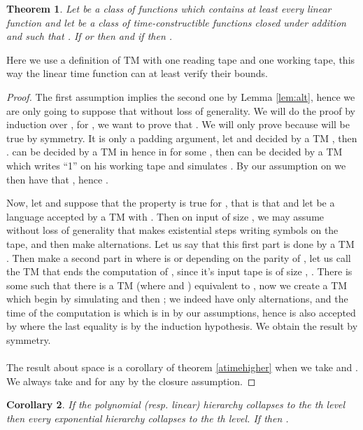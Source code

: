 \documentclass[a4paper,12pt]{article}
\newtheorem{theorem}{Theorem}[section]
\newtheorem{corollary}[theorem]{Corollary}
\theoremstyle{definition}
\begin{document}
\begin{theorem}\label{little_collapse}
  Let  be a class of functions which contains at least every linear
  function and let  be a class of time-constructible functions
  closed under addition and such that . If  or
   then  and if
   then .
\end{theorem}
Here we use a definition of TM with one reading tape and one working
tape, this way the linear time function can at least verify their
bounds.
\begin{proof}
  The first assumption implies the second one by Lemma \ref{lem:alt},
  hence we are only going to suppose that
   without loss of generality. We will do
  the proof by induction over , for , we want to prove that
  .  We will only prove 
  because  will be true by symmetry. It is only a padding
  argument, let  and  decided by a TM ,
  then .  can be decided by a TM 
  in  hence in  for some ,
  then  can be decided by a TM 
  which writes  ``1'' on his working tape and simulates . By
  our assumption on  we then have that ,
  hence .

  Now, let  and suppose that the property is true for , that
  is that  and let 
  be a language accepted by a TM  with . Then on input  of size , we may assume without loss of
  generality that  makes  existential steps writing 
  symbols on the tape, and then make  alternations. Let us say
  that this first part is done by a TM . Then  make a second
  part in  where  is  or 
  depending on the parity of , let us call  the TM that
  ends the computation of , since it's input tape is of size
  , . There is some  such that there is a
  TM  (where  and
  ) equivalent to , now we create a TM 
  which begin by simulating  and then ; we indeed have
  only  alternations, and the time of the computation is
   which is in  by our assumptions, hence  is also
  accepted by  where the last
  equality is by the induction hypothesis. We obtain the result
   by symmetry.
\paragraph{}
The result about space is a corollary of theorem \ref{atimehigher}
when we take  and . We always take  and
for any   by the closure
assumption.
\end{proof}
\begin{corollary}\label{cor:collapse} 
  If the polynomial (resp. linear) hierarchy collapses to the th
  level then every exponential hierarchy collapses to the th
  level. If  then
  .
\end{corollary}
\end{document}
